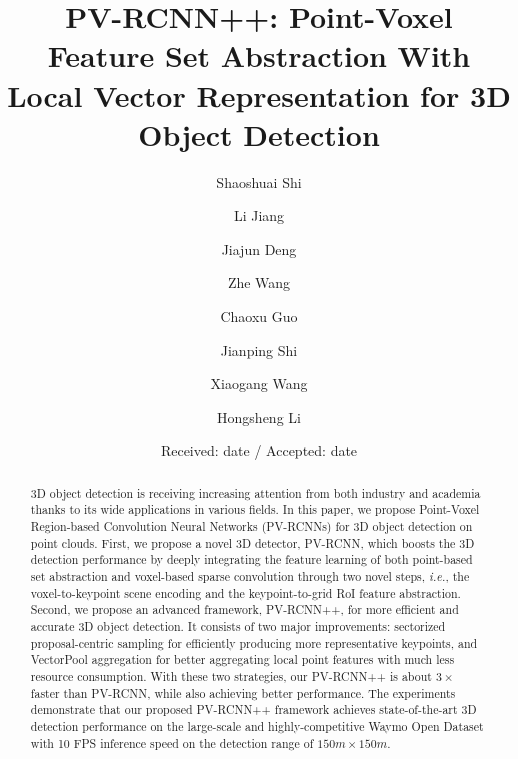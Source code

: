 \documentclass[natbib,twocolumn]{svjour3}          \smartqed  \usepackage{graphicx}
\begin{document}
\title{PV-RCNN++: Point-Voxel Feature Set Abstraction With Local Vector Representation for 3D  Object Detection
}

\author{Shaoshuai Shi \and Li Jiang \and Jiajun Deng \and Zhe Wang \and Chaoxu Guo \and Jianping Shi \and Xiaogang Wang \and Hongsheng Li
}




\date{Received: date / Accepted: date}



\maketitle

\begin{abstract}
3D object detection is receiving increasing attention from both industry and academia thanks to its wide applications in various fields. In this paper, we propose Point-Voxel Region-based Convolution Neural Networks (PV-RCNNs) for 3D object detection on point clouds. First, we propose a novel 3D detector, PV-RCNN, which boosts the 3D detection performance by deeply integrating the feature learning of both point-based set abstraction and voxel-based sparse convolution through two novel steps, \emph{i.e.}, the voxel-to-keypoint scene encoding and the keypoint-to-grid RoI feature abstraction. Second, we propose an advanced framework, PV-RCNN++, for more efficient and accurate 3D object detection. It consists of two major improvements: sectorized proposal-centric sampling for efficiently producing more representative keypoints, and VectorPool aggregation for better aggregating local point features with much less resource consumption. With these two strategies, our PV-RCNN++ is about $3\times$ faster than PV-RCNN, while also achieving better performance. The experiments demonstrate that our proposed PV-RCNN++ framework achieves state-of-the-art 3D detection performance on the large-scale and highly-competitive Waymo Open Dataset with 10 FPS inference speed on the detection range of $150m \times 150m$.  


\end{abstract}
\end{document}
